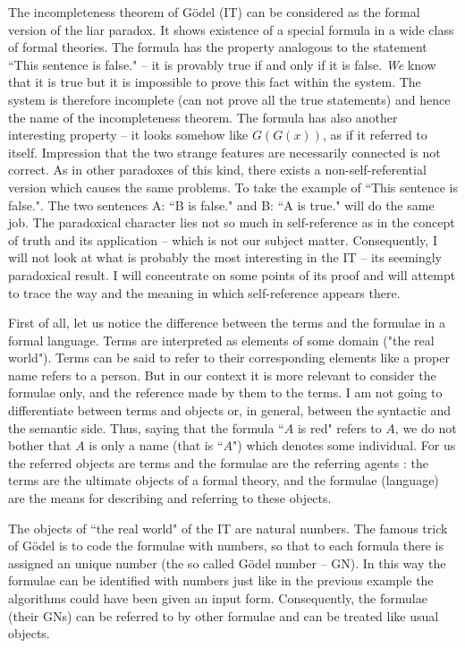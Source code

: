 The incompleteness theorem of G\"{o}del (IT) can be considered as the formal version of the liar paradox. It shows 
existence of a special formula in a wide class of formal theories. The formula has the property analogous to the 
statement ``This sentence is false." -- it is provably true if and only if it is false. 
{\em We} know that it is true but it is 
impossible to prove this fact within the system. The system is therefore incomplete (can not prove all the true 
statements) and hence the name of the incompleteness theorem. The formula has also another interesting property -- 
it looks somehow like $G(G(x))$, as if it referred to itself. Impression that the two strange features are necessarily 
connected is not correct. As in other paradoxes of this kind, there exists a non-self-referential version which causes 
the same problems. To take the example of ``This sentence is false.". The two sentences A: ``B is false." and B: ``A 
is true." will do the same job. The paradoxical character lies not so much in self-reference as in the concept of truth 
and its application --  which is not our subject matter. Consequently, I will not look at what is probably the most 
interesting in the IT -- its seemingly paradoxical result. I will concentrate on some points of its proof and will 
attempt to trace the way and the meaning in which self-reference appears there.

First of all, let us notice the difference between the terms and the formulae in a formal language. Terms are 
interpreted as elements of some domain ("the real world"). Terms can be said to refer to their corresponding 
elements like a proper name refers to a person. But in our context it is more relevant to consider the formulae 
only, and the reference made by them to the terms. I am not going to differentiate between terms and objects or, in 
general, between the syntactic and the semantic side. Thus, saying that the formula ``$A$ is red" refers to $A$, we do 
not bother that $A$ is only a name (that is ``$A$") which denotes some individual. 
For us the referred objects are terms and the formulae are the referring agents : the terms
are the ultimate objects of a formal theory, and the formulae (language) 
 are the means for describing and referring to these objects.

The objects of ``the real world" of the IT are natural numbers. The famous trick of G\"{o}del is to code the formulae 
with numbers, so that to each formula there is assigned an unique number (the so called G\"{o}del number --  GN). In 
this way the formulae can be identified with numbers just like in the previous example the algorithms could have 
been given an input form. Consequently, the formulae (their GNs) can be referred to by other formulae and can be 
treated like usual objects.

